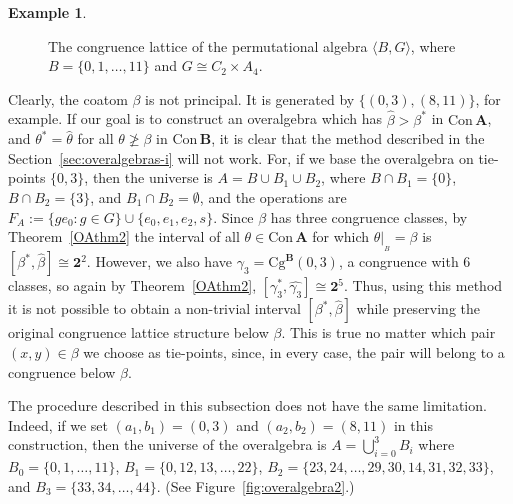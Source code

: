 \documentclass[cm,dissertation]{uhthesis}
\theoremstyle{plain}
\theoremstyle{definition}
\newtheorem{example}[theorem]{Example}
\theoremstyle{remark}
\numberwithin{theorem}{section}
\numberwithin{claim}{chapter}
\numberwithin{equation}{section}
\numberwithin{conjecture}{chapter}
\newcommand{\<}{\ensuremath{\langle}}
\renewcommand{\>}{\ensuremath{\rangle}}
\renewcommand{\ngeq}{\ensuremath{\ngeqslant}}
\newcommand{\Cg}{\ensuremath{\mathrm{Cg}}}
\newcommand{\Con}{\ensuremath{\mathrm{Con\,}}}
\newcommand{\Sub}{\ensuremath{\mathrm{Sub}}}
\newcommand{\0}{\ensuremath{\mathbf{0}}}
\newcommand{\1}{\ensuremath{\mathbf{1}}}
\newcommand{\2}{\ensuremath{\mathbf{2}}}
\newcommand{\3}{\ensuremath{\mathbf{3}}}
\newcommand{\4}{\ensuremath{\mathbf{4}}}
\newcommand{\5}{\ensuremath{\mathbf{5}}}
\newcommand{\bA}{\ensuremath{\mathbf{A}}}
\newcommand{\bB}{\ensuremath{\mathbf{B}}}
\newcommand{\resB}{\ensuremath{|_{_B}}}
\newcommand{\two}{\ensuremath{\mathbf{2}}}
\begin{document}
\begin{example}
\begin{figure}[h!]
    \caption{%
      The congruence lattice of the permutational algebra $\<B, G\>$, where 
      $B = \{0, 1, \dots, 11\}$ and $G\cong C_2 \times A_4$.}
    \label{fig:OverAlgebra-C2xA4}
  \end{figure}

  Clearly, the coatom $\beta$ is not principal.  
  It is generated by $\{(0,3), (8,11)\}$, for example. 
  If our goal is to construct an overalgebra which has $\widehat{\beta} > \beta^*$
  in $\Con \bA$, and $\theta^* = \widehat{\theta}$ for all $\theta \ngeq \beta$ in
  $\Con\bB$, it is clear that the method described in the 
  Section~\ref{sec:overalgebras-i} will not work.
  For, if we base the overalgebra on tie-points $\{0,3\}$, then the universe is $A
  = B \cup B_1 \cup B_2$, where $B\cap B_1 = \{0\}$,  $B\cap B_2 = \{3\}$, and
  $B_1 \cap B_2 = \emptyset$, and the operations are $F_A := \{g e_0 : g\in G\}
  \cup \{e_0, e_1, e_2, s\}$. 
  Since $\beta$ has three congruence classes, by Theorem~\ref{OAthm2}
  the interval of all $\theta \in \Con\bA$ for which 
  $\theta\resB = \beta$ is $[\beta^*, \widehat{\beta}] \cong \two^2$.
  However, we also have $\gamma_3 =\Cg^\bB(0, 3)$, a congruence with 6 classes, so 
  again by Theorem~\ref{OAthm2}, $[\gamma_3^*, \widehat{\gamma_3}]\cong
  \two^5$.
  Thus, using this method it is not possible to obtain a non-trivial
  interval $[\beta^*, \widehat{\beta}]$ while preserving the original congruence
  lattice structure below $\beta$.  This is true no matter which pair $(x,y) \in
  \beta$ we choose as tie-points, since, in every case, the pair will belong to a
  congruence below $\beta$. 

  The procedure described in this subsection %
  does not have the same limitation.
  Indeed, if we set $(a_1, b_1) = (0, 3)$ and $(a_2, b_2) = (8, 11)$ in this 
  construction, then the universe of the overalgebra is $A =
  \bigcup_{i=0}^3 B_i$ where
  $B_0 = \{0, 1, \dots, 11 \}$, 
  $B_1 = \{0, 12, 13, \dots, 22 \}$,
  $B_2 = \{ 23, 24, \dots, 29, 30, 14, 31, 32, 33 \}$, and
  $B_3 = \{ 33, 34, \dots, 44 \}$.  (See Figure~\ref{fig:overalgebra2}.)

  \begin{figure}[h!]
    \centering
        {
          }
\end{figure}
\end{example}
\end{document}
